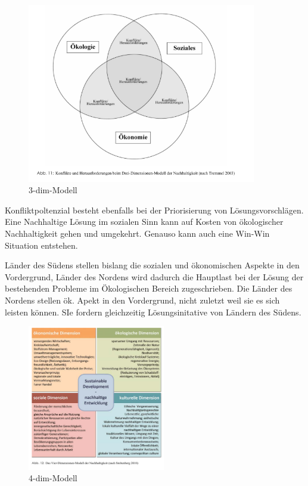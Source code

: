 \documentclass{scrartcl}
\begin{document}
\begin{figure}[h]
\centering
\includegraphics[width=10cm]{image_folder/dreidimensionenmodell_der_N.png}
\caption{3-dim-Modell}
\label{fig:3-dimensionen Modell}
\end{figure}

Konfliktpoltenzial besteht ebenfalls bei der Priorisierung von Lösungsvorschlägen. Eine Nachhaltige Lösung im sozialen Sinn kann auf Kosten von ökologischer Nachhaltigkeit gehen und umgekehrt. Genauso kann auch eine Win-Win Situation entstehen.

Länder des Südens stellen bislang die sozialen und ökonomischen Aspekte in den Vordergrund, Länder des Nordens wird dadurch die Hauptlast bei der Lösung der bestehenden Probleme im Ökologischen Bereich zugeschrieben. Die Länder des Nordens stellen ök. Apekt in den Vordergrund, nicht zuletzt weil sie es sich leisten können. SIe fordern gleichzeitig Lösungsinitative von Ländern des Südens.

\begin{figure}[h]
\centering
\includegraphics[width=6cm]{image_folder/vierdimensionenmodell_der_N.png}
\caption{4-dim-Modell}
\label{fig:4-dimensionen Modell}
\end{figure}
\end{document}
